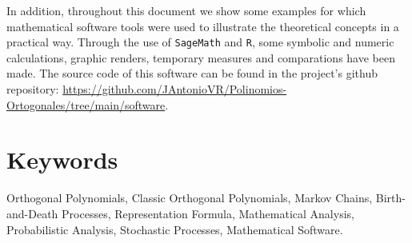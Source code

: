 In addition, throughout this document we show some examples for which mathematical software tools were used to illustrate the theoretical concepts in a practical way. Through the use of \texttt{SageMath} and \texttt{R}, some symbolic and numeric calculations, graphic renders, temporary measures and comparations have been made. The source code of this software can be found in the project's github repository: \url{https://github.com/JAntonioVR/Polinomios-Ortogonales/tree/main/software}.



\section*{Keywords}

Orthogonal Polynomials, Classic Orthogonal Polynomials, Markov Chains, Birth-and-Death Processes, Representation Formula, Mathematical Analysis, Probabilistic Analysis, Stochastic Processes, Mathematical Software.